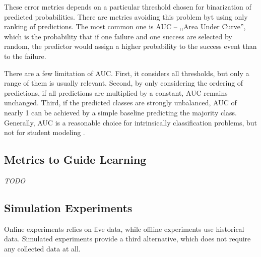 
These error metrics depends on a particular threshold chosen
  for binarization of predicted probabilities.
There are metrics avoiding this problem byt using only ranking of predictions.
The most common one is AUC -- ,,Area Under Curve'',
  which is the probability that if one failure and one success are selected by random,
  the predictor would assign a higher probability to the success event than to the failure.

There are a few limitation of AUC.
First, it considers all thresholds, but only a range of them is usually relevant.
Second, by only considering the ordering of predictions,
  if all predictions are multiplied by a constant, AUC remains unchanged.
Third, if the predicted classes are strongly unbalanced, AUC of nearly 1
  can be achieved by a simple baseline predicting the majority class.
Generally, AUC is a reasonable choice for intrinsically classification problems,
  but not for student modeling \cite{pelanek-evaluation-student-models}.



\subsection{Metrics to Guide Learning}
\label{sec:metrics-to-guide-learning}

\emph{TODO}



\subsection{Simulation Experiments}

Online experiments relies on live data,
while offline experiments use historical data.
Simulated experiments provide a third alternative,
  which does not require any collected data at all.

